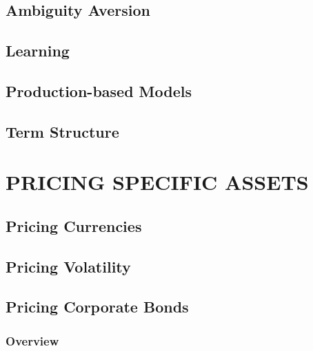 \documentclass[
]{book}
\begin{document}
\hypertarget{ambiguity-aversion}{%
\chapter{Ambiguity Aversion}\label{ambiguity-aversion}}

\hypertarget{learning}{%
\chapter{Learning}\label{learning}}

\hypertarget{production-based-models}{%
\chapter{Production-based Models}\label{production-based-models}}

\hypertarget{term-structure}{%
\chapter{Term Structure}\label{term-structure}}

\hypertarget{part-pricing-specific-assets}{%
\part*{PRICING SPECIFIC ASSETS}\label{part-pricing-specific-assets}}

\hypertarget{pricing-currencies}{%
\chapter{Pricing Currencies}\label{pricing-currencies}}

\hypertarget{pricing-volatility}{%
\chapter{Pricing Volatility}\label{pricing-volatility}}

\hypertarget{pricing-corporate-bonds}{%
\chapter{Pricing Corporate Bonds}\label{pricing-corporate-bonds}}

\hypertarget{overview}{%
\section{Overview}\label{overview}}
\end{document}
